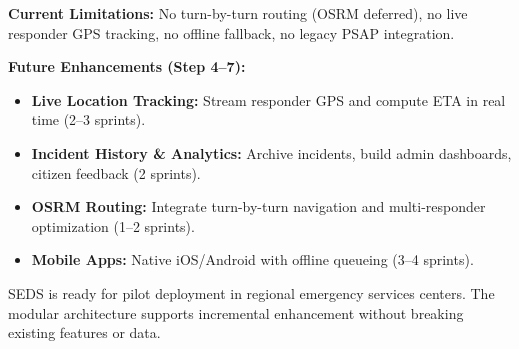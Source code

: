 \textbf{Current Limitations:} No turn-by-turn routing (OSRM deferred), no live responder GPS tracking, no offline fallback, no legacy PSAP integration.

\textbf{Future Enhancements (Step 4--7):}
\begin{itemize}
  \item \textbf{Live Location Tracking:} Stream responder GPS and compute ETA in real time (2--3 sprints).
  \item \textbf{Incident History \& Analytics:} Archive incidents, build admin dashboards, citizen feedback (2 sprints).
  \item \textbf{OSRM Routing:} Integrate turn-by-turn navigation and multi-responder optimization (1--2 sprints).
  \item \textbf{Mobile Apps:} Native iOS/Android with offline queueing (3--4 sprints).
\end{itemize}

SEDS is ready for pilot deployment in regional emergency services centers. The modular architecture supports incremental enhancement without breaking existing features or data.

